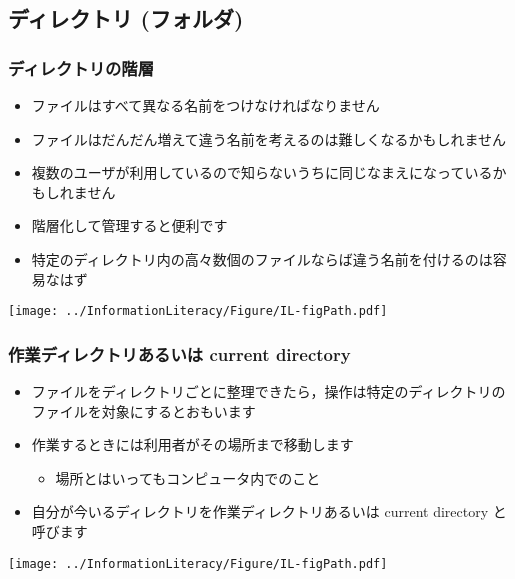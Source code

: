 \subsection{ディレクトリ (フォルダ)}
\begin{frame}
\frametitle{ディレクトリの階層}
  \begin{itemize}
\footnotesize
\item ファイルはすべて異なる名前をつけなければなりません
\item ファイルはだんだん増えて違う名前を考えるのは難しくなるかもしれません
\item 複数のユーザが利用しているので知らないうちに同じなまえになっているかもしれません
\item 階層化して管理すると便利です
\item 特定のディレクトリ内の高々数個のファイルならば違う名前を付けるのは容易なはず
  \end{itemize}
  \begin{center}
\texttt{[image: ../InformationLiteracy/Figure/IL-figPath.pdf]}
  \end{center}
\end{frame}
\begin{frame}
\frametitle{作業ディレクトリあるいは current directory}
  \begin{itemize}
\item ファイルをディレクトリごとに整理できたら，操作は特定のディレクトリのファイルを対象にするとおもいます
\item 作業するときには利用者がその場所まで移動します
    \begin{itemize}
\item 場所とはいってもコンピュータ内でのこと
    \end{itemize}
\item 自分が今いるディレクトリを作業ディレクトリあるいは current directory と呼びます
  \end{itemize}
  \begin{center}
\texttt{[image: ../InformationLiteracy/Figure/IL-figPath.pdf]}
  \end{center}
\end{frame}

